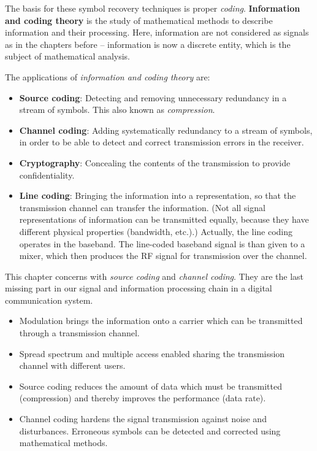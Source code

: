 \begin{refsection}
The basis for these symbol recovery techniques is proper  \emph{coding}.  \textbf{Information and coding theory} is the study of mathematical methods to describe information and their processing. Here, information are not considered as signals as in the chapters before -- information is now a discrete entity, which is the subject of mathematical analysis.

The applications of \emph{information and coding theory} are:
\begin{itemize}
	\item \textbf{Source coding}: Detecting and removing unnecessary redundancy in a stream of symbols. This also known as \emph{compression}.
	\item \textbf{Channel coding}: Adding systematically redundancy to a stream of symbols, in order to be able to detect and correct transmission errors in the receiver.
	\item \textbf{Cryptography}: Concealing the contents of the transmission to provide confidentiality.
	\item \textbf{Line coding}: Bringing the information into a representation, so that the transmission channel can transfer the information. (Not all signal representations of information can be transmitted equally, because they have different physical properties (bandwidth, etc.).) Actually, the line coding operates in the baseband. The line-coded baseband signal is than given to a mixer, which then produces the \ac{RF} signal for transmission over the channel.
\end{itemize}

This chapter concerns with \emph{source coding} and \emph{channel coding}. They are the last missing part in our signal and information processing chain in a digital communication system.
\begin{itemize}
	\item Modulation brings the information onto a carrier which can be transmitted through a transmission channel.
	\item Spread spectrum and multiple access enabled sharing the transmission channel with different users.
	\item Source coding reduces the amount of data which must be transmitted (compression) and thereby improves the performance (data rate).
	\item Channel coding hardens the signal transmission against noise and disturbances. Erroneous symbols can be detected and corrected using mathematical methods.
\end{itemize}


\end{refsection}
